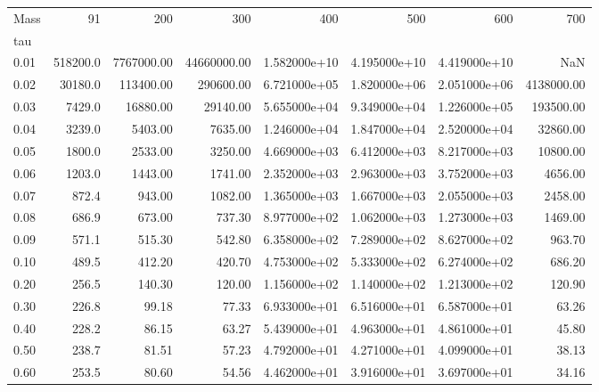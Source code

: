 \begin{tabular}{lrrrrrrr}
\toprule
Mass &       91  &         200 &          300 &           400 &           500 &           600 &         700 \\
tau   &           &             &              &               &               &               &             \\
\midrule
0.01  &  518200.0 &  7767000.00 &  44660000.00 &  1.582000e+10 &  4.195000e+10 &  4.419000e+10 &         NaN \\
0.02  &   30180.0 &   113400.00 &    290600.00 &  6.721000e+05 &  1.820000e+06 &  2.051000e+06 &  4138000.00 \\
0.03  &    7429.0 &    16880.00 &     29140.00 &  5.655000e+04 &  9.349000e+04 &  1.226000e+05 &   193500.00 \\
0.04  &    3239.0 &     5403.00 &      7635.00 &  1.246000e+04 &  1.847000e+04 &  2.520000e+04 &    32860.00 \\
0.05  &    1800.0 &     2533.00 &      3250.00 &  4.669000e+03 &  6.412000e+03 &  8.217000e+03 &    10800.00 \\
0.06  &    1203.0 &     1443.00 &      1741.00 &  2.352000e+03 &  2.963000e+03 &  3.752000e+03 &     4656.00 \\
0.07  &     872.4 &      943.00 &      1082.00 &  1.365000e+03 &  1.667000e+03 &  2.055000e+03 &     2458.00 \\
0.08  &     686.9 &      673.00 &       737.30 &  8.977000e+02 &  1.062000e+03 &  1.273000e+03 &     1469.00 \\
0.09  &     571.1 &      515.30 &       542.80 &  6.358000e+02 &  7.289000e+02 &  8.627000e+02 &      963.70 \\
0.10  &     489.5 &      412.20 &       420.70 &  4.753000e+02 &  5.333000e+02 &  6.274000e+02 &      686.20 \\
0.20  &     256.5 &      140.30 &       120.00 &  1.156000e+02 &  1.140000e+02 &  1.213000e+02 &      120.90 \\
0.30  &     226.8 &       99.18 &        77.33 &  6.933000e+01 &  6.516000e+01 &  6.587000e+01 &       63.26 \\
0.40  &     228.2 &       86.15 &        63.27 &  5.439000e+01 &  4.963000e+01 &  4.861000e+01 &       45.80 \\
0.50  &     238.7 &       81.51 &        57.23 &  4.792000e+01 &  4.271000e+01 &  4.099000e+01 &       38.13 \\
0.60  &     253.5 &       80.60 &        54.56 &  4.462000e+01 &  3.916000e+01 &  3.697000e+01 &       34.16 \\

\end{tabular}
